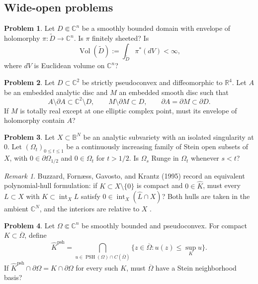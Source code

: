 \documentclass[11pt,reqno]{amsart}
\theoremstyle{definition}
\newtheorem{problem}{Problem}[section]
\theoremstyle{remark}
\newtheorem*{remark}{Remark}
\begin{document}
\subsection{Wide-open problems}

\begin{problem}\label{b95-3-3-1}
Let $D\Subset\mathbb C^n$ be a smoothly bounded domain with envelope of holomorphy $\pi:\widetilde D\to\mathbb C^n$. Is $\pi$ finitely sheeted? Is
\[
 \operatorname{Vol}(\widetilde D):=\int_{\widetilde D}\pi^*(dV)<\infty,
\]
where $dV$ is Euclidean volume on $\mathbb C^n$?
\end{problem}

\begin{problem}\label{b95-3-3-2}
Let $D\subset\mathbb C^2$ be strictly pseudoconvex and diffeomorphic to $\mathbb R^4$. Let $A$ be an embedded analytic disc and $M$ an embedded smooth disc such that
\[
 A\setminus\partial A\subset\mathbb C^2\setminus D,\qquad
 M\setminus\partial M\subset D,\qquad
 \partial A=\partial M\subset\partial D.
\]
If $M$ is totally real except at one elliptic complex point, must its envelope of holomorphy contain $A$?
\end{problem}

\begin{problem}\label{b95-4-2-1}\label{FS-3.7}
Let $X\subset\mathbb B^N$ be an analytic subvariety with an isolated singularity at $0$. Let $(\Omega_t)_{0\leq t\leq1}$ be a continuously increasing family of Stein open subsets of $X$, with $0\in\partial\Omega_{1/2}$ and $0\in\Omega_t$ for $t>1/2$. Is $\Omega_s$ Runge in $\Omega_t$ whenever $s<t$?
\end{problem}
\begin{remark}
Buzzard, Forn\ae ss, Gavosto, and Krantz (1995) record an equivalent polynomial-hull formulation: if $K\subset X\setminus\{0\}$ is compact and $0\in\widehat K$, must every $L\subset X$ with $K\subset\operatorname{int}_X L$ satisfy $0\in\operatorname{int}_X(\widehat L\cap X)$? Both hulls are taken in the ambient $\mathbb C^N$, and the interiors are relative to $X$ \cite[Problems~4.2.1--4.2.2]{B95}.
\end{remark}

\begin{problem}\label{b95-7-6-1}
Let $\Omega\Subset\mathbb C^n$ be smoothly bounded and pseudoconvex. For compact $K\subset\overline\Omega$, define
\[
 \widehat K^{\mathrm{psh}}
 =\bigcap_{u\in\operatorname{PSH}(\Omega)\cap C(\overline\Omega)}
 \{z\in\overline\Omega:u(z)\leq\sup_Ku\}.
\]
If $\widehat K^{\mathrm{psh}}\cap\partial\Omega=K\cap\partial\Omega$ for every such $K$, must $\overline\Omega$ have a Stein neighborhood basis?
\end{problem}
\end{document}
